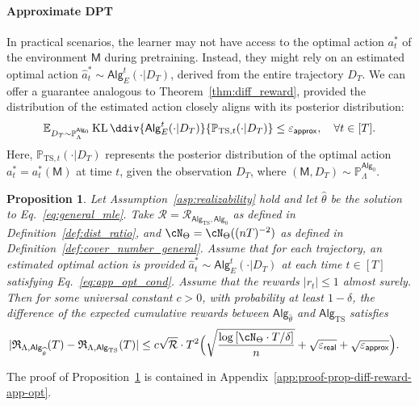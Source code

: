 \documentclass[10pt]{article}
\newtheorem{proposition}[theorem]{Proposition}
\renewcommand{\epsilon}{\varepsilon}
\newcommand{\eps}{\varepsilon}
\newcommand{\KL}{\operatorname{KL}\ddiv}
\newcommand{\<}{\left\langle}
\renewcommand{\>}{\right\rangle}
\newcommand{\brac}[1]{{\left[ #1 \right]}}
\newcommand{\E}{\mathbb{E}}
\renewcommand{\P}{\mathbb{P}}
\newcommand{\inst}{{\mathsf{M}}}
\newcommand{\TS}{{\mathrm{TS}}}
\newcommand{\action}{{a}}
\newcommand{\reward}{{r}}
\newcommand{\totlen}{{T}}
\newcommand{\sAlg}{{\mathsf{Alg}}}
\newcommand{\dset}{{D}}
\newcommand{\Numobs}{{n}}
\newcommand{\Parspace}{{\Theta}}
\newcommand{\appeps}{\eps_{{\mathsf{approx}}}}
\newcommand{\EstPar}{{\widehat{\theta}}}
\newcommand{\prior}{{\Lambda}}
\newcommand{\shortexp}{{E}}
\newcommand{\geneps}{{\epsilon}_{\sf real}}
\newcommand{\totreward}{{\mathfrak{R}}}
\newcommand{\distratio}{{\mathcal{R}}}
\begin{document}
\paragraph{Approximate DPT} In practical scenarios, the learner may not have access to the optimal action $\action^*_t$ of the environment $\inst$ during pretraining. Instead, they might rely on an estimated optimal action $\widehat\action_t^* \sim \sAlg_{\shortexp}^t(\cdot | \dset_\totlen)$, derived from the entire trajectory $\dset_\totlen$. We can offer a guarantee analogous to Theorem~\ref{thm:diff_reward}, provided the distribution of the estimated action closely aligns with its posterior distribution:
\begin{align}\E_{\dset_\totlen\sim\P_{\prior}^{\sAlg_0}}\KL{\sAlg_{\shortexp}^t(\cdot | \dset_\totlen)}{\P_{\TS,t}(\cdot|\dset_\totlen)}\leq\appeps,~~~ \forall t \in [\totlen].
\label{eq:app_opt_cond}
\end{align}
Here, $\P_{\TS,t}(\cdot|\dset_\totlen)$ represents the posterior distribution of the optimal action $\action^*_t=\action^*_t(\inst)$ at time $t$, given the observation $\dset_\totlen$, where $(\inst, \dset_\totlen) \sim \P_\prior^{\sAlg_0}$.
\begin{proposition}\label{prop:app_opt_diff_reward} Let Assumption~\ref{asp:realizability} hold and let $\EstPar$ be the solution to Eq.~\eqref{eq:general_mle}. Take $\distratio = \distratio_{\sAlg_\TS,\sAlg_0}$ as defined in Definition~\ref{def:dist_ratio}, and $\cN_{\Parspace} = \cN_{\Parspace}((\Numobs\totlen)^{-2})$  as defined in Definition~\ref{def:cover_number_general}. Assume that for each trajectory, an estimated optimal action is provided $\widehat\action_t^* \sim \sAlg_{\shortexp}^t(\cdot | \dset_\totlen)$ at each time $t\in[\totlen]$ satisfying Eq.~\eqref{eq:app_opt_cond}.
Assume that the rewards $|\reward_t|\leq 1$  almost surely. Then for some universal constant $c>0$, with probability at least $1-\delta$, the difference of the expected cumulative rewards between $\sAlg_\EstPar$ and $\sAlg_\TS$ satisfies
\begin{align*}
|\totreward_{\prior,\sAlg_\EstPar}(\totlen)-\totreward_{\prior,\sAlg_\TS}(\totlen)|
&\leq
c \sqrt{\distratio}\cdot\totlen^2 \Big( \sqrt{\frac{\log \brac{ \cN_{\Parspace} \cdot \totlen/\delta } }{n} } + \sqrt{\geneps} + \sqrt{\appeps} \Big).
\end{align*}
\end{proposition}
The proof of Proposition~\ref{prop:app_opt_diff_reward} is contained in Appendix~\ref{app:proof-prop-diff-reward-app-opt}.
\end{document}
